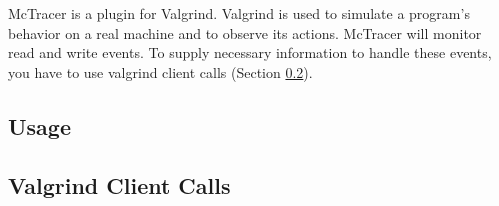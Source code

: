 McTracer is a plugin for Valgrind.
Valgrind is used to simulate a program's behavior on a real machine and to observe its actions.
McTracer will monitor read and write events.
To supply necessary information to handle these events, you have to use valgrind client calls (Section \ref{vgclientcalls}).
\subsection{Usage} 
\subsection{Valgrind Client Calls} \label{vgclientcalls} 
